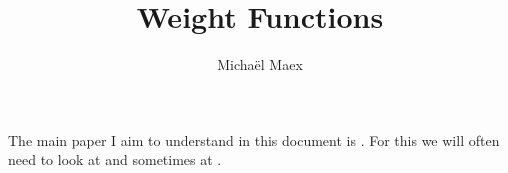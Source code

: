 \documentclass[a4paper]{article}
\title{Weight Functions}
\author{Michaël Maex}
\begin{document}
\maketitle

\tableofcontents



\todototoc
\listoftodos
\pagebreak

The main paper I aim to understand in this document is \cite{bakerWeightFunctionsBerkovich2016}. 
For this we will often need to look at \cite{nicaiseBerkovichSkeletaBirational2016} and sometimes at \cite{mustataWeightFunctionsNonArchimedean2015}. 




\pagebreak
\printbibliography
\end{document}
